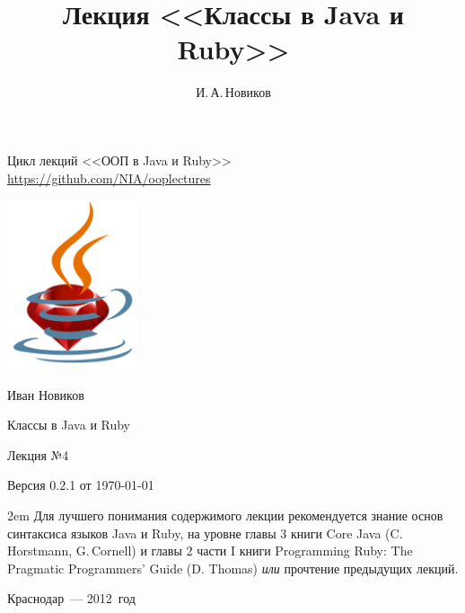 \documentclass[a4paper, 14pt, titlepage]{extarticle}
\author{И.\,А.\,Новиков}
\title{Лекция <<Классы в Java и Ruby>>}
\newcommand{\eng}[1]{{\English #1}}
\newenvironment{indented}%
    { \begingroup %
        \noindent %
        \leftskip2em %
        \rightskip\leftskip }%
    { \par\endgroup }
\begin{document}

  \begin{titlepage}
  \begin{center}
    Цикл лекций <<ООП в Java и Ruby>>\\
    \url{https://github.com/NIA/ooplectures}

    \vspace{4cm}
    
    \includegraphics[height=5cm]{ruby-in-cup}

    Иван Новиков

    {\Large Классы в Java и Ruby}

    Лекция №4

    {\small Версия 0.2.1 от \today}

  \end{center}

    \begin{flushright}

    \end{flushright}

    \vspace{3cm}
    
    \begin{indented}
      \small Для лучшего понимания содержимого лекции рекомендуется знание основ синтаксиса языков
      Java и Ruby, на уровне главы 3 книги \eng{Core Java (C.\,Horstmann, G.\,Cornell)} и главы 2
      части I книги \eng{Programming Ruby: The Pragmatic Programmers' Guide (D. Thomas)} \emph{или}
      прочтение предыдущих лекций.
    \end{indented}

    \vfill
  
  \begin{center}

    Краснодар~--- 2012~год

  \end{center}
  \end{titlepage}
\end{document}
